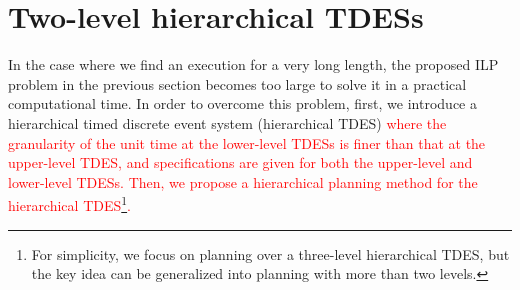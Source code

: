 \documentclass[journal,twoside,web]{IEEEtran}
\renewcommand{\Pr}{\widehat{Pr}}
\newcommand{\tick}{{\sf tick}}
\newcommand{\ttick}{{\textit tick}}
\newcommand{\Len}{{\sf L}}
\newcommand{\U}[1]{\mathcal{U}_{[#1]}}
\newcommand{\F}[1]{\Diamond_{[#1]}}
\newcommand{\G}[1]{\Box_{[#1]}}
\newcommand{\red}[1]{\textcolor{red}{#1}}
\begin{document}
\begin{comment}
\subsubsection{Simulation result}
%
We consider the following hard constraint, and soft constraints and their weight.
\begin{align}
\phi=&\F{0,\Len}p_{fin},\notag \\
\Psi 
=&\{
(\psi_1=\G{0,\Len}(\lnot p_s),3),~
(\psi_2=\F{0,\Len}p_3,1),\notag \\
&~~(\psi_3=\F{0,\Len}p_4,1),~
(\psi=((\lnot p_4) \U{0,\Len} p_3,2)
\}.\notag
\end{align}
%
We use Gurobi to compute an optimal execution that optimizing the objective function $J_\kappa$. 
Let $\Len=20$. We compute optimal executions $\pi^1$, $\pi^2$, and $\pi^3$ with $\kappa=0.01,~0.5,1$, respectively, such that $\Pr(\pi^1)$, $\Pr(\pi^2)$, and $\Pr(\pi^3)$ are given by
\begin{align}
\Pr(\pi^1)=&
s_0,\ttick,s_0,\ttick,s_0,e_{03},s_3,\ttick,s_3,\ttick,\notag\\
&s_3,e_{34},s_4,\ttick,s_4,e_{40},s_0,e_{01},s_1,\notag\\
&\ttick,s_1,e_{12},s_2,\ttick,s_2,e_{25},s_5,\ldots,s_5\notag\\
\Pr(\pi^2)=&
s_0,\ttick,s_0,\ttick,s_0,e_{03},s_3,\ttick,\notag\\
&s_3,\ttick,s_3,e_{35},s_5,\ldots,s_5\notag \\
\Pr(\pi^3)=&s_0,e_{01},s_1,\ttick,s_1,e_{12},s_2,\ttick,s_2,e_{25},s_5,\ldots,s_5\notag
\end{align}
%
The time for $\pi^1$, $\pi^2$, and $\pi^3$ are 7, 4, and 2 [\tick], respectively.
The sum of weight of soft constraints satisfied by $\pi^1$, $\pi^2$, and $\pi^3$ are 4, 3, and 0.
The results of executions are shown that the combination of satisfied soft constraints is changed when the value of $\kappa$ is changed while satisfying the hard constraint.
%
\end{comment}
%
\section{Two-level hierarchical TDESs}\label{def:htdes}
%
%
In the case where we find an execution for a very long length, the proposed ILP problem in the previous section becomes too large to solve it in a practical computational time. 
In order to overcome this problem, first, we introduce a hierarchical timed discrete event system (hierarchical TDES) \red{where the granularity of the unit time at the lower-level TDESs is finer than that at the upper-level TDES, and specifications are given for both the upper-level and lower-level TDESs. Then, we propose a hierarchical planning method for the hierarchical TDES\footnote{For simplicity, we focus on planning over a three-level hierarchical TDES, but the key idea can be generalized into planning with more than two levels.}.}
\end{document}
